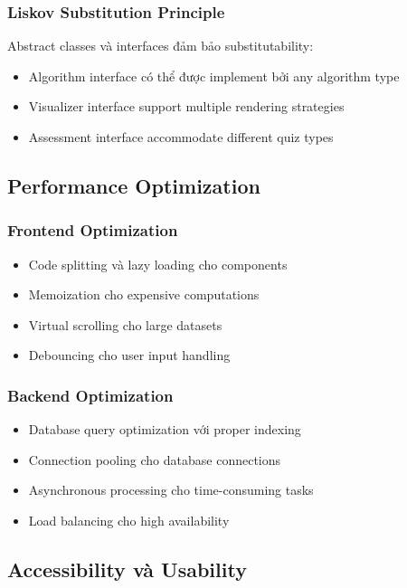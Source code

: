 \subsubsection{Liskov Substitution Principle}
Abstract classes và interfaces đảm bảo substitutability:
\begin{itemize}
    \item Algorithm interface có thể được implement bởi any algorithm type
    \item Visualizer interface support multiple rendering strategies
    \item Assessment interface accommodate different quiz types
\end{itemize}

\subsection{Performance Optimization}

\subsubsection{Frontend Optimization}
\begin{itemize}
    \item Code splitting và lazy loading cho components
    \item Memoization cho expensive computations
    \item Virtual scrolling cho large datasets
    \item Debouncing cho user input handling
\end{itemize}

\subsubsection{Backend Optimization}
\begin{itemize}
    \item Database query optimization với proper indexing
    \item Connection pooling cho database connections
    \item Asynchronous processing cho time-consuming tasks
    \item Load balancing cho high availability
\end{itemize}

\subsection{Accessibility và Usability}

